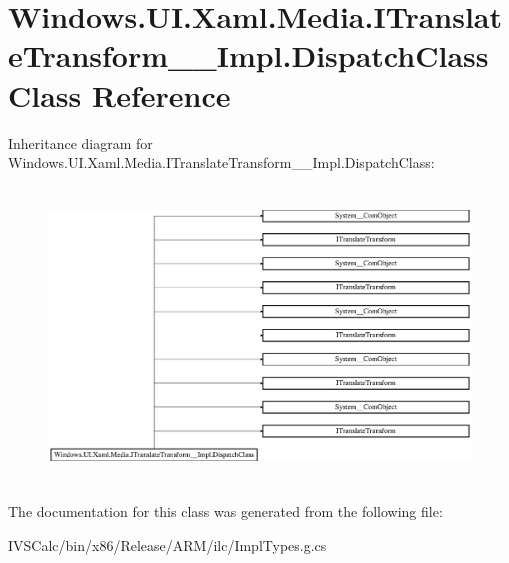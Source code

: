 \hypertarget{class_windows_1_1_u_i_1_1_xaml_1_1_media_1_1_i_translate_transform_____impl_1_1_dispatch_class}{}\section{Windows.\+U\+I.\+Xaml.\+Media.\+I\+Translate\+Transform\+\_\+\+\_\+\+Impl.\+Dispatch\+Class Class Reference}
\label{class_windows_1_1_u_i_1_1_xaml_1_1_media_1_1_i_translate_transform_____impl_1_1_dispatch_class}
Inheritance diagram for Windows.\+U\+I.\+Xaml.\+Media.\+I\+Translate\+Transform\+\_\+\+\_\+\+Impl.\+Dispatch\+Class\+:\begin{figure}[H]
\begin{center}
\leavevmode
\includegraphics[height=7.857142cm]{class_windows_1_1_u_i_1_1_xaml_1_1_media_1_1_i_translate_transform_____impl_1_1_dispatch_class}
\end{center}
\end{figure}


The documentation for this class was generated from the following file\+:\begin{DoxyCompactItemize}
\item 
I\+V\+S\+Calc/bin/x86/\+Release/\+A\+R\+M/ilc/Impl\+Types.\+g.\+cs\end{DoxyCompactItemize}
